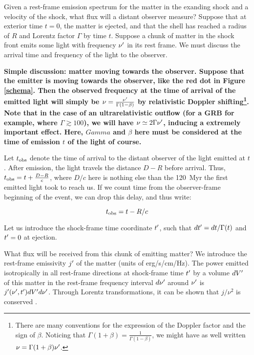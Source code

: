 Given a rest-frame emission spectrum for the matter in the exanding shock and a velocity of the shock, what flux will a distant observer measure? Suppose that at exterior time $t = 0$, the matter is ejected, and that the shell has reached a radius of $R$ and Lorentz factor $\Gamma$ by time $t$. Suppose a chunk of matter in the shock front emits some light with frequency $\nu^{\prime}$ in its rest frame. We must discuss the arrival time and frequency of the light to the observer.


\bf{Simple discussion: matter moving towards the observer. }Suppose that the emitter is moving towards the observer, like the red dot in Figure \ref{schema}. Then the observed frequency at the time of arrival of the emitted light will simply be $\nu = \frac{\nu^{\prime}}{\Gamma(1 - \beta)}$ by relativistic Doppler shifting\footnote{There are many conventions for the expression of the Doppler factor and the sign of $\beta$. Noticing that $\Gamma(1 + \beta) = \frac{1}{\Gamma(1 - \beta)}$, we might have as well written $\nu = \Gamma (1 + \beta) \nu^{\prime}$.}. Note that in the case of an ultrarelativistic outflow (for a GRB for example, where $\Gamma \gtrsim 100$), we will have $\nu \simeq 2 \Gamma \nu^{\prime}$, inducing a extremely important effect. Here, $Gamma$ and $\beta$ here must be considered at the time of emission $t$ of the light of course.

Let $t_{\mathrm{obs}}$ denote the time of arrival to the distant observer of the light emitted at $t$. After emission, the light travels the distance $D - R$ before arrival. Thus, $t_{\mathrm{obs}} = t + \frac{D - R}{c}$, where $D/c$ here is nothing else than the 120~Myr the first emitted light took to reach us. If we count time from the observer-frame beginning of the event, we can drop this delay, and thus write:

\begin{equation}\label{tobs}
    t_{\mathrm{obs}} = t - R/c
\end{equation}

Let us introduce the shock-frame time coordinate $t^{\prime}$, such that $dt^{\prime} = dt/\Gamma(t)$ and $t^{\prime} = 0$ at ejection.

What flux will be received from this chunk of emitting matter? We introduce the rest-frame emissivity $j^{\prime}$ of the matter (units of erg/s/cm/Hz). The power emitted isotropically in all rest-frame directions at shock-frame time $t^{\prime}$ by a volume $dV^{\prime}$ of this matter in the rest-frame frequency interval $d\nu^{\prime}$ around $\nu^{\prime}$ is $j^{\prime}(\nu^{\prime}, t^{\prime})dV^{\prime} d\nu^{\prime}$. Through Lorentz transformations, it can be shown that $j/\nu^2$ is conserved \citep[see e.g.][sec. 4]{55}.

